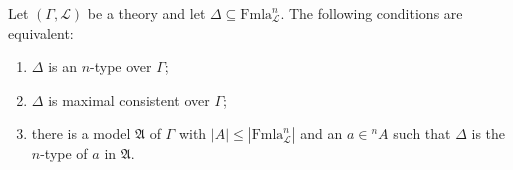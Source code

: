 Let $(\Gamma, \mathcal{L})$ be a theory and let $\Delta \subseteq \mathrm{Fmla}^n_{\mathcal{L}}$. The following conditions are equivalent:
\begin{enumerate}
\item[(i)] $\Delta$ is an $n$-type over $\Gamma$;
\item[(ii)] $\Delta$ is maximal consistent over $\Gamma$;
\item[(iii)] there is a model $\mathfrak{A}$ of $\Gamma$ with $|A| \leq |\mathrm{Fmla}^n_{\mathcal{L}}|$ and an $a \in {}^n A$ such that $\Delta$ is the $n$-type of $a$ in $\mathfrak{A}$.
\end{enumerate}
